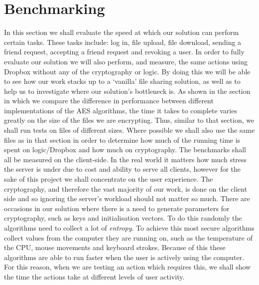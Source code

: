 \documentclass[12pt, titlepage]{article}
\begin{document}
\section{Benchmarking}
In this section we shall evaluate the speed at which our solution can perform certain tasks. These tasks include: log in, file upload, file download, sending a friend request, accepting a friend request and revoking a user. In order to fully evaluate our solution we will also perform, and measure, the same actions using Dropbox without any of the cryptography or logic. By doing this we will be able to see how our work stacks up to a `vanilla' file sharing solution, as well as to help us to investigate where our solution's bottleneck is.
\newline \indent As shown in the section in which we compare the difference in performance between different implementations of the AES algorithms, the time it takes to complete varies greatly on the size of the files we are encrypting. Thus, similar to that section, we shall run tests on files of different sizes. Where possible we shall also use the same files as in that section in order to determine how much of the running time is spent on logic/Dropbox and how much on cryptography.
\newline \indent The benchmarks shall all be measured on the client-side. In the real world it matters how much stress the server is under due to cost and ability to serve all clients, however for the sake of this project we shall concentrate on the user experience. The cryptography, and therefore the vast majority of our work, is done on the client side and so ignoring the server's workload should not matter so much.
\newline \indent There are occasions in our solution where there is a need to generate parameters for cryptography, such as keys and initialisation vectors. To do this randomly the algorithms need to collect a lot of \textit{entropy}. To achieve this most secure algorithms collect values from the computer they are running on, such as the temperature of the CPU, mouse movements and keyboard strokes. Because of this these algorithms are able to run faster when the user is actively using the computer. For this reason, when we are testing an action which requires this, we shall show the time the actions take at different levels of user activity.
\end{document}
